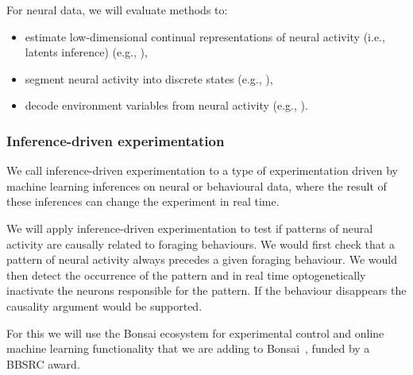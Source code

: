 For neural data, we will evaluate methods to:

\begin{itemize}

    \item estimate low-dimensional continual representations of
        neural activity (i.e., latents inference)
        (e.g., \cite{mackeEtAl11}),

    \item segment neural activity into discrete states
        (e.g., \cite{escolaEtAl11}),

    \item decode environment variables from neural activity
        (e.g., \cite{dengEtAl15}).

\end{itemize}


\subsubsection{Inference-driven experimentation}

We call inference-driven experimentation to a type of experimentation driven by
machine learning inferences on neural or behavioural data, where the result of
these inferences can change the experiment in real time.

We will apply inference-driven experimentation to test if patterns of neural
activity are causally related to foraging behaviours.
%
We would first check that a pattern of neural activity always precedes a given
foraging behaviour. We would then detect the occurrence of the pattern and in
real time optogenetically inactivate the neurons responsible for the pattern.
%
If the behaviour disappears the causality argument would be supported.

For this we will use the Bonsai ecosystem for experimental
control and online machine learning functionality that we are
adding to Bonsai~\cite{bonsaiML}, funded by a BBSRC award.


